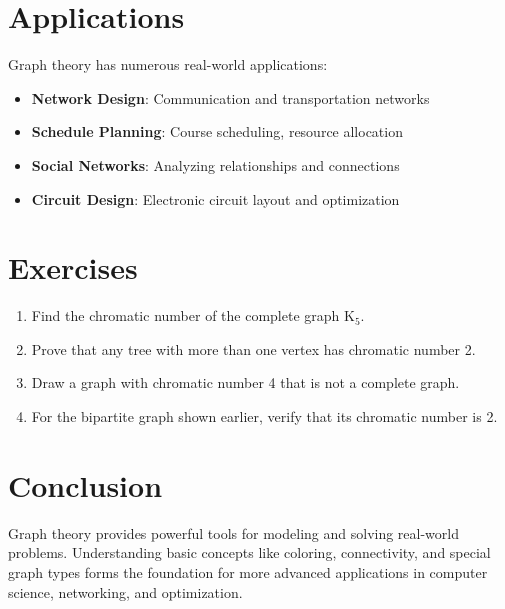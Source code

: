 \documentclass[12pt,a4paper]{article}
\theoremstyle{definition}
\begin{document}
\section{Applications}
\begin{tcolorbox}[theorembox]
Graph theory has numerous real-world applications:
\begin{itemize}
    \item \textbf{Network Design}: Communication and transportation networks
    \item \textbf{Schedule Planning}: Course scheduling, resource allocation
    \item \textbf{Social Networks}: Analyzing relationships and connections
    \item \textbf{Circuit Design}: Electronic circuit layout and optimization
\end{itemize}
\end{tcolorbox}

\section{Exercises}
\begin{enumerate}
    \item Find the chromatic number of the complete graph K\(_5\).
    \item Prove that any tree with more than one vertex has chromatic number 2.
    \item Draw a graph with chromatic number 4 that is not a complete graph.
    \item For the bipartite graph shown earlier, verify that its chromatic number is 2.
\end{enumerate}

\section{Conclusion}
\begin{tcolorbox}[theorembox]
Graph theory provides powerful tools for modeling and solving real-world problems. Understanding basic concepts like coloring, connectivity, and special graph types forms the foundation for more advanced applications in computer science, networking, and optimization.
\end{tcolorbox}
\end{document}
